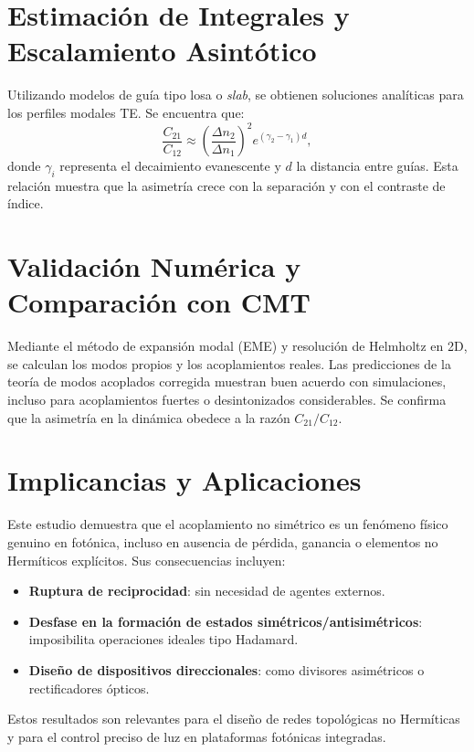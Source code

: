 \section{Estimación de Integrales y Escalamiento Asintótico}

Utilizando modelos de guía tipo losa o \textit{slab}, se obtienen soluciones analíticas para los perfiles modales TE. Se encuentra que:
\begin{equation}
	\frac{C_{21}}{C_{12}} \approx \left( \frac{\Delta n_2}{\Delta n_1} \right)^2 e^{(\gamma_2 - \gamma_1)d},
\end{equation}
donde \( \gamma_i \) representa el decaimiento evanescente y \( d \) la distancia entre guías. Esta relación muestra que la asimetría crece con la separación y con el contraste de índice.
\section{Validación Numérica y Comparación con CMT}
Mediante el método de expansión modal (EME) y resolución de Helmholtz en 2D, se calculan los modos propios y los acoplamientos reales. Las predicciones de la teoría de modos acoplados corregida muestran buen acuerdo con simulaciones, incluso para acoplamientos fuertes o desintonizados considerables. Se confirma que la asimetría en la dinámica obedece a la razón \( C_{21}/C_{12} \).
\section{Implicancias y Aplicaciones}
Este estudio demuestra que el acoplamiento no simétrico es un fenómeno físico genuino en fotónica, incluso en ausencia de pérdida, ganancia o elementos no Hermíticos explícitos. Sus consecuencias incluyen:
\begin{itemize}
	\item \textbf{Ruptura de reciprocidad}: sin necesidad de agentes externos.
	\item \textbf{Desfase en la formación de estados simétricos/antisimétricos}: imposibilita operaciones ideales tipo Hadamard.
	\item \textbf{Diseño de dispositivos direccionales}: como divisores asimétricos o rectificadores ópticos.
\end{itemize}
Estos resultados son relevantes para el diseño de redes topológicas no Hermíticas y para el control preciso de luz en plataformas fotónicas integradas.

